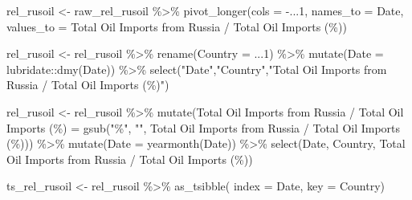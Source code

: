\documentclass[
]{article}
\newenvironment{Shaded}{\begin{snugshade}}{\end{snugshade}}
\newcommand{\AttributeTok}[1]{\textcolor[rgb]{0.77,0.63,0.00}{#1}}
\newcommand{\DecValTok}[1]{\textcolor[rgb]{0.00,0.00,0.81}{#1}}
\newcommand{\FunctionTok}[1]{\textcolor[rgb]{0.00,0.00,0.00}{#1}}
\newcommand{\NormalTok}[1]{#1}
\newcommand{\OtherTok}[1]{\textcolor[rgb]{0.56,0.35,0.01}{#1}}
\newcommand{\SpecialCharTok}[1]{\textcolor[rgb]{0.00,0.00,0.00}{#1}}
\newcommand{\StringTok}[1]{\textcolor[rgb]{0.31,0.60,0.02}{#1}}
\begin{document}
\begin{Shaded}
\begin{Highlighting}[]
\NormalTok{rel\_rusoil }\OtherTok{\textless{}{-}}\NormalTok{ raw\_rel\_rusoil }\SpecialCharTok{\%\textgreater{}\%} 
  \FunctionTok{pivot\_longer}\NormalTok{(}\AttributeTok{cols =} \SpecialCharTok{{-}}\NormalTok{...}\DecValTok{1}\NormalTok{,}
               \AttributeTok{names\_to =} \StringTok{\textquotesingle{}Date\textquotesingle{}}\NormalTok{,}
               \AttributeTok{values\_to =} \StringTok{\textquotesingle{}Total Oil Imports from Russia / Total Oil Imports (\%)\textquotesingle{}}\NormalTok{)}

\NormalTok{rel\_rusoil }\OtherTok{\textless{}{-}}\NormalTok{ rel\_rusoil }\SpecialCharTok{\%\textgreater{}\%} 
  \FunctionTok{rename}\NormalTok{(}\AttributeTok{Country =}\NormalTok{ ...}\DecValTok{1}\NormalTok{) }\SpecialCharTok{\%\textgreater{}\%} 
  \FunctionTok{mutate}\NormalTok{(}\AttributeTok{Date =}\NormalTok{ lubridate}\SpecialCharTok{::}\FunctionTok{dmy}\NormalTok{(Date)) }\SpecialCharTok{\%\textgreater{}\%} 
  \FunctionTok{select}\NormalTok{(}\StringTok{"Date"}\NormalTok{,}\StringTok{"Country"}\NormalTok{,}\StringTok{"Total Oil Imports from Russia / Total Oil Imports (\%)"}\NormalTok{)}

\NormalTok{rel\_rusoil }\OtherTok{\textless{}{-}}\NormalTok{ rel\_rusoil }\SpecialCharTok{\%\textgreater{}\%} 
  \FunctionTok{mutate}\NormalTok{(}\StringTok{\textasciigrave{}}\AttributeTok{Total Oil Imports from Russia / Total Oil Imports (\%)}\StringTok{\textasciigrave{}} \OtherTok{=} \FunctionTok{gsub}\NormalTok{(}\StringTok{"\%"}\NormalTok{, }\StringTok{""}\NormalTok{, }\StringTok{\textasciigrave{}}\AttributeTok{Total Oil Imports from Russia / Total Oil Imports (\%)}\StringTok{\textasciigrave{}}\NormalTok{)) }\SpecialCharTok{\%\textgreater{}\%} \FunctionTok{mutate}\NormalTok{(}\AttributeTok{Date =} \FunctionTok{yearmonth}\NormalTok{(Date)) }\SpecialCharTok{\%\textgreater{}\%} 
  \FunctionTok{select}\NormalTok{(Date, Country, }\StringTok{\textasciigrave{}}\AttributeTok{Total Oil Imports from Russia / Total Oil Imports (\%)}\StringTok{\textasciigrave{}}\NormalTok{)}

\NormalTok{ts\_rel\_rusoil }\OtherTok{\textless{}{-}}\NormalTok{ rel\_rusoil }\SpecialCharTok{\%\textgreater{}\%} 
  \FunctionTok{as\_tsibble}\NormalTok{(}
    \AttributeTok{index =}\NormalTok{ Date,}
    \AttributeTok{key =}\NormalTok{ Country)}



\end{Highlighting}
\end{Shaded}
\end{document}
